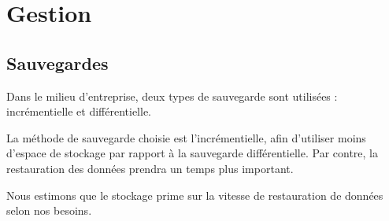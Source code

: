 \chapter*{Gestion}
\label{cha:gestion}

\section{Sauvegardes}
\label{sec:sauvegardes}

Dans le milieu d'entreprise, deux types de sauvegarde sont utilisées :
incrémentielle et différentielle.

La méthode de sauvegarde choisie est l'incrémentielle, afin d'utiliser moins
d'espace de stockage par rapport à la sauvegarde différentielle. Par contre, la
restauration des données prendra un temps plus important.

Nous estimons que le stockage prime sur la vitesse de restauration de données
selon nos besoins.